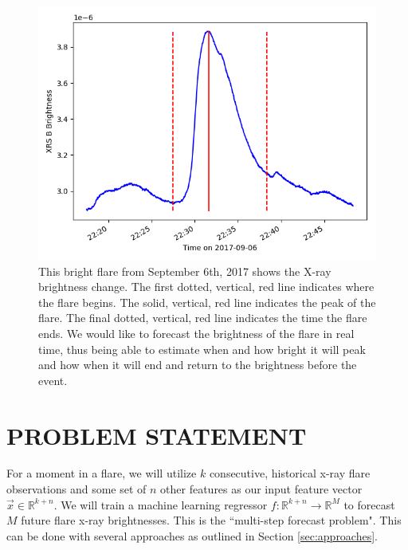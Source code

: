 \documentclass[letterpaper, 10 pt, onecolumn]{ieeeconf}
\begin{document}
\begin{figure}[h!]
    \centering
    \includegraphics[scale=0.55]{flare_example.png}
    \caption{This bright flare from September 6th, 2017 shows the X-ray brightness change. The first dotted, vertical, red line indicates where the flare begins. The solid, vertical, red line indicates the peak of the flare. The final dotted, vertical, red line indicates the time the flare ends. We would like to forecast the brightness of the flare in real time, thus being able to estimate when and how bright it will peak and how when it will end and return to the brightness before the event.} 
    \label{fig:example}
\end{figure}

\section{PROBLEM STATEMENT}

For a moment in a flare, we will utilize $k$ consecutive, historical x-ray flare observations and some set of $n$ other features as our input feature vector $\vec{x} \in \mathbb{R}^{k+n}$. We will train a machine learning regressor $f:\mathbb{R}^{k+n} \to \mathbb{R}^M$ to forecast $M$ future flare x-ray brightnesses. This is the ``multi-step forecast problem". This can be done with several approaches as outlined in Section \ref{sec:approaches}. 
\end{document}
